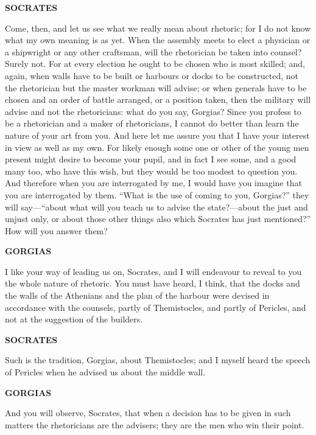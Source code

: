 \documentclass[11pt,letter]{article}
\begin{document}
\par \textbf{SOCRATES}
\par   Come, then, and let us see what we really mean about rhetoric; for I do not know what my own meaning is as yet. When the assembly meets to elect a physician or a shipwright or any other craftsman, will the rhetorician be taken into counsel? Surely not. For at every election he ought to be chosen who is most skilled; and, again, when walls have to be built or harbours or docks to be constructed, not the rhetorician but the master workman will advise; or when generals have to be chosen and an order of battle arranged, or a position taken, then the military will advise and not the rhetoricians:  what do you say, Gorgias? Since you profess to be a rhetorician and a maker of rhetoricians, I cannot do better than learn the nature of your art from you. And here let me assure you that I have your interest in view as well as my own. For likely enough some one or other of the young men present might desire to become your pupil, and in fact I see some, and a good many too, who have this wish, but they would be too modest to question you. And therefore when you are interrogated by me, I would have you imagine that you are interrogated by them. “What is the use of coming to you, Gorgias?” they will say—“about what will you teach us to advise the state?—about the just and unjust only, or about those other things also which Socrates has just mentioned?” How will you answer them?

\par \textbf{GORGIAS}
\par   I like your way of leading us on, Socrates, and I will endeavour to reveal to you the whole nature of rhetoric. You must have heard, I think, that the docks and the walls of the Athenians and the plan of the harbour were devised in accordance with the counsels, partly of Themistocles, and partly of Pericles, and not at the suggestion of the builders.

\par \textbf{SOCRATES}
\par   Such is the tradition, Gorgias, about Themistocles; and I myself heard the speech of Pericles when he advised us about the middle wall.

\par \textbf{GORGIAS}
\par   And you will observe, Socrates, that when a decision has to be given in such matters the rhetoricians are the advisers; they are the men who win their point.
\end{document}
